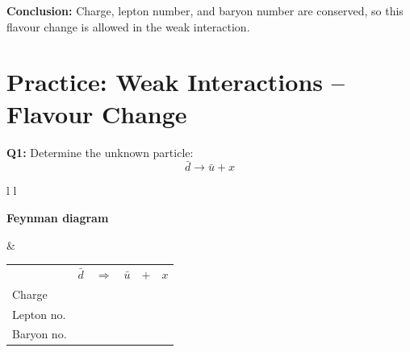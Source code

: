 \documentclass[12pt]{article}
\begin{document}
\textbf{Conclusion:} Charge, lepton number, and baryon number are conserved, so this flavour change is allowed in the weak interaction.

\vspace{0.9cm}

\section*{Practice: Weak Interactions -- Flavour Change}


\textbf{Q1:} Determine the unknown particle:
\[
\bar{d} \rightarrow \bar{u} + x
\]

\vspace{0.5cm}

\begin{tabular}{l l}

\begin{minipage}[t]{0.46\textwidth}
\vspace{0pt}
\textbf{Feynman diagram}

\vspace{0.6cm}

\begin{tikzpicture}
\begin{feynman}
  \vertex (l1) at (0,0) {\(\bar{d}\)};
  \vertex [coordinate] (a) at (1,2) {};
  \vertex (l2) at (0,4) {\(\bar{u}\)};
  \vertex (b) at (4,2) {};

  \diagram*{
    (l1) -- [fermion] (a) -- [fermion] (l2),
    (a) -- [boson, edge label=\(x\), momentum'={}] (b),
  };
\end{feynman}
\end{tikzpicture}
\end{minipage}
&
\begin{minipage}[t]{0.50\textwidth}
\vspace{0pt}

\renewcommand{\arraystretch}{1.4}
\begin{tabular}{@{}l c c c c c@{}}
 & \(\bar{d}\) & \(\Rightarrow\) & \(\bar{u}\) & \(+\) & \(x\) \\
Charge &  &  &  &  &  \\
Lepton no. &  &  &  &  &  \\
Baryon no. &  &  &  &  &  \\
\end{tabular}

\end{minipage}

\end{tabular}
\end{document}
